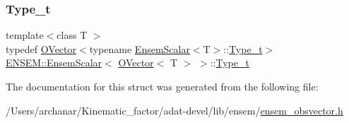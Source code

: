 \subsubsection{\texorpdfstring{Type\_t}{Type\_t}\hspace{0.1cm}{\footnotesize\ttfamily [3/3]}}
{\footnotesize\ttfamily template$<$class T $>$ \\
typedef \mbox{\hyperlink{classENSEM_1_1OVector}{O\+Vector}}$<$typename \mbox{\hyperlink{structENSEM_1_1EnsemScalar}{Ensem\+Scalar}}$<$T$>$\+::\mbox{\hyperlink{structENSEM_1_1EnsemScalar_3_01OVector_3_01T_01_4_01_4_a5b4151f8ecc24331a77edc8130f525f7}{Type\+\_\+t}}$>$ \mbox{\hyperlink{structENSEM_1_1EnsemScalar}{E\+N\+S\+E\+M\+::\+Ensem\+Scalar}}$<$ \mbox{\hyperlink{classENSEM_1_1OVector}{O\+Vector}}$<$ T $>$ $>$\+::\mbox{\hyperlink{structENSEM_1_1EnsemScalar_3_01OVector_3_01T_01_4_01_4_a5b4151f8ecc24331a77edc8130f525f7}{Type\+\_\+t}}}



The documentation for this struct was generated from the following file\+:\begin{DoxyCompactItemize}
\item 
/\+Users/archanar/\+Kinematic\+\_\+factor/adat-\/devel/lib/ensem/\mbox{\hyperlink{adat-devel_2lib_2ensem_2ensem__obsvector_8h}{ensem\+\_\+obsvector.\+h}}\end{DoxyCompactItemize}
